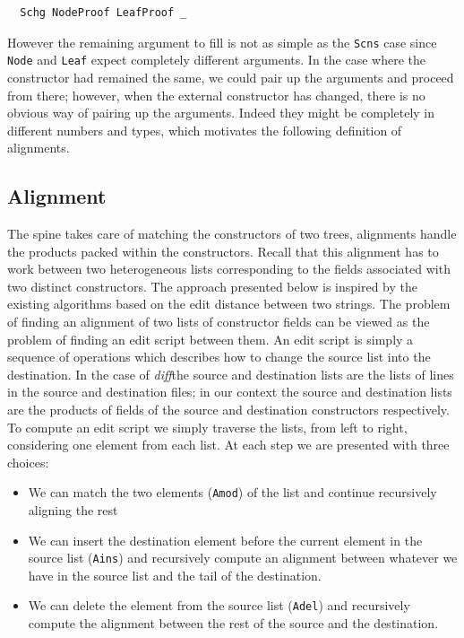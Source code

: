 \documentclass[11pt, titlepage]{article}
\newcommand{\toHaskell}[1]{\texttt{#1}\xspace}
\newcommand{\diff}{\emph{diff}}
\newcommand{\ains}{\toHaskell{Ains}}
\newcommand{\adel}{\toHaskell{Adel}}
\newcommand{\amod}{\toHaskell{Amod}}
\begin{document}
\begin{verbatim}
  Schg NodeProof LeafProof _
\end{verbatim}

However the remaining argument to fill is not as simple as the \texttt{Scns} case since \texttt{Node} and \texttt{Leaf} expect completely different 
arguments.
In the case where the constructor had remained the same, we could 
pair up the arguments and proceed from there; however, when the
external constructor has changed, there is no obvious way of pairing up
the arguments. Indeed they might be completely in different numbers and types, which 
motivates the following definition of alignments.

\subsection{Alignment}\label{alignment}

The spine takes care of matching
the constructors of two trees, alignments handle the products packed within the constructors.
Recall that this alignment has to work between two heterogeneous lists
corresponding to the fields associated with two distinct constructors.
The approach presented below is inspired by the existing algorithms
based on the edit distance between two strings. The problem of finding
an alignment of two lists of constructor fields can be viewed as the
problem of finding an edit script between them. An edit script is
simply a sequence of operations which describes how to change the source
list into the destination. In the case of \diff the source and destination lists are the lists of lines in the source and destination files; in our context
the source and destination lists are the products of fields of the source and destination constructors respectively. 
To compute an edit script we simply
traverse the lists, from left to right, considering one element from each
list. At each step we are presented with three choices:

\begin{itemize}
\item
  We can match the two elements (\amod) of the list and continue
  recursively aligning the rest
\item
  We can insert the destination element before the current element in
  the source list (\ains) and recursively compute an alignment between
  whatever we have in the source list and the tail of the destination.
\item
  We can delete the element from the source list (\adel) and recursively
  compute the alignment between the rest of the source and the
  destination.
\end{itemize}
\end{document}
